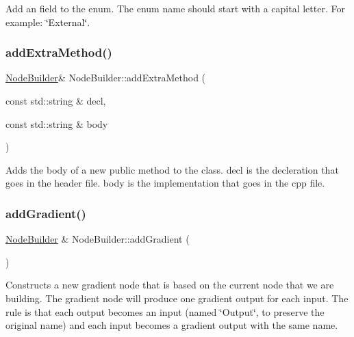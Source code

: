 Add an field to the enum. The enum name should start with a capital letter. For example\+: \char`\"{}\+External\char`\"{}. \mbox{\label{class_node_builder_ab2a15b943fa94aac99cddb5b92b439e9}} 
\subsubsection{\texorpdfstring{add\+Extra\+Method()}{addExtraMethod()}}
{\footnotesize\ttfamily \hyperlink{class_node_builder}{Node\+Builder}\& Node\+Builder\+::add\+Extra\+Method (\begin{DoxyParamCaption}\item[{const std\+::string \&}]{decl,  }\item[{const std\+::string \&}]{body }\end{DoxyParamCaption})\hspace{0.3cm}{\ttfamily [inline]}}

Adds the body of a new public method to the class. {\ttfamily decl} is the decleration that goes in the header file. {\ttfamily body} is the implementation that goes in the cpp file. \mbox{\label{class_node_builder_a12bc758e5d8a853e540bdfdcd9338ef4}} 
\subsubsection{\texorpdfstring{add\+Gradient()}{addGradient()}}
{\footnotesize\ttfamily \hyperlink{class_node_builder}{Node\+Builder} \& Node\+Builder\+::add\+Gradient (\begin{DoxyParamCaption}{ }\end{DoxyParamCaption})}

Constructs a new gradient node that is based on the current node that we are building. The gradient node will produce one gradient output for each input. The rule is that each output becomes an input (named \char`\"{}\+Output\char`\"{}, to preserve the original name) and each input becomes a gradient output with the same name. \mbox{\label{class_node_builder_ad1aa1ad3f01f69333c848b40f4b50b93}} 
